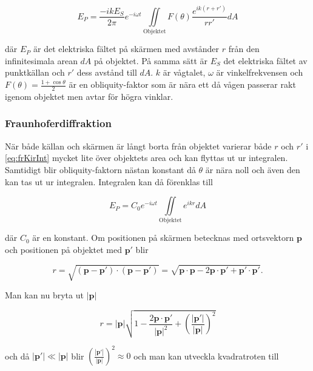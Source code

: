 \documentclass[a4paper]{article}
\begin{document}
\begin{equation}
	E_P = \frac{-i k E_S}{2\pi} e^{-i \omega t} \iint\limits_{\mathrm{Objektet}} {F(\theta)\frac{e^{i k (r + r')}}{r r'} d A}
	\label{eq:frKirInt}
\end{equation}

där $E_P$ är det elektriska fältet på skärmen med avstånder $r$ från den infinitesimala arean $d A$ på objektet. På samma sätt är $E_S$ det elektriska fältet av punktkällan och $r'$ dess avstånd till $d A$. $k$ är vågtalet, $\omega$ är vinkelfrekvensen och $F(\theta) = \frac{1 + \cos\theta}{2}$ är en obliquity-faktor som är nära ett då vågen passerar rakt igenom objektet men avtar för högra vinklar.

\subsubsection{Fraunhoferdiffraktion}

När både källan och skärmen är långt borta från objektet varierar både $r$ och $r'$ i \eqref{eq:frKirInt} mycket lite över objektets area och kan flyttas ut ur integralen. Samtidigt blir obliquity-faktorn nästan konstant då $\theta$ är nära noll och även den kan tas ut ur integralen. Integralen kan då förenklas till \cite[p.~331]{pearsonIntroOpt}

\begin{equation}
	E_P = C_0 e^{-i \omega t} \iint\limits_{\mathrm{Objektet}} {e^{i k r} dA}
	\label{eq:fraunhofer}
\end{equation}

där $C_0$ är en konstant. Om positionen på skärmen betecknas med ortsvektorn $\boldsymbol{p}$ och positionen på objektet med $\boldsymbol{p'}$ blir

\begin{equation}
	r = \sqrt{(\boldsymbol{p} - \boldsymbol{p'})\cdot(\boldsymbol{p} - \boldsymbol{p'})} = \sqrt{\boldsymbol{p}\cdot\boldsymbol{p} - 2 \boldsymbol{p}\cdot\boldsymbol{p'} + \boldsymbol{p'}\cdot\boldsymbol{p'}}\text{.}
\end{equation}

Man kan nu bryta ut $|\boldsymbol{p}|$

\begin{equation}
r = |\boldsymbol{p}|\sqrt{1 - \frac{2\boldsymbol{p}\cdot\boldsymbol{p'}}{|\boldsymbol{p}|^2} + \left(\frac{|\boldsymbol{p'}|}{|\boldsymbol{p}|}\right)^2}
\end{equation}

och då $|\boldsymbol{p'}|\ll|\boldsymbol{p}|$ blir $\left(\frac{|\boldsymbol{p'}|}{|\boldsymbol{p}|}\right)^2\approx 0$ och man kan utveckla kvadratroten till
\end{document}
